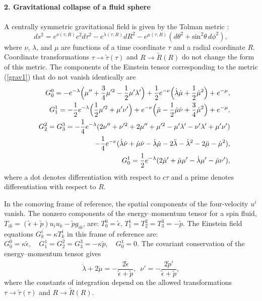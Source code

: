 \documentclass[prd,onecolumn,nofootinbib]{revtex4}
\begin{document}
{\bf 2. Gravitational collapse of a fluid sphere}\\ \\
A centrally symmetric gravitational field is given by the Tolman metric \cite{LL2}:
\begin{equation}
    ds^2=e^{\nu(\tau,R)}c^2 d\tau^2-e^{\lambda(\tau,R)}dR^2-e^{\mu(\tau,R)}(d\theta^2+\mbox{sin}^2\theta\,d\phi^2),
    \label{grav1}
\end{equation}
where $\nu$, $\lambda$, and $\mu$ are functions of a time coordinate $\tau$ and a radial coordinate $R$.
Coordinate transformations $\tau\rightarrow\tilde{\tau}(\tau)$ and $R\rightarrow\tilde{R}(R)$ do not change the form of this metric.
The components of the Einstein tensor corresponding to the metric (\ref{grav1}) that do not vanish identically are \cite{LL2}
\begin{eqnarray}
    & & G_0^0=-e^{-\lambda}\Bigl(\mu''+\frac{3}{4}\mu'^2-\frac{1}{2}\mu'\lambda'\Bigr)+\frac{1}{2}e^{-\nu}\Bigl(\dot{\lambda}\dot{\mu}+\frac{1}{2}\dot{\mu}^2\Bigr)+e^{-\mu}, \nonumber \\
    & & G_1^1=-\frac{1}{2}e^{-\lambda}\Bigl(\frac{1}{2}\mu'^2+\mu'\nu'\Bigr)+e^{-\nu}\Bigl(\ddot{\mu}-\frac{1}{2}\dot{\mu}\dot{\nu}+\frac{3}{4}\dot{\mu}^2\Bigr)+e^{-\mu}, \nonumber \\
    & & G_2^2=G_3^3=-\frac{1}{4}e^{-\lambda}(2\nu''+\nu'^2+2\mu''+\mu'^2-\mu'\lambda'-\nu'\lambda'+\mu'\nu') \nonumber \\
    & & -\frac{1}{4}e^{-\nu}(\dot{\lambda}\dot{\nu}+\dot{\mu}\dot{\nu}-\dot{\lambda}\dot{\mu}-2\ddot{\lambda}-\dot{\lambda}^2-2\ddot{\mu}-\dot{\mu}^2), \nonumber \\
    & & G_0^1=\frac{1}{2}e^{-\lambda}(2\dot{\mu}'+\dot{\mu}\mu'-\dot{\lambda}\mu'-\dot{\mu}\nu'),
    \label{grav2}
\end{eqnarray}
where a dot denotes differentiation with respect to $c\tau$ and a prime denotes differentiation with respect to $R$.

In the comoving frame of reference, the spatial components of the four-velocity $u^i$ vanish.
The nonzero components of the energy--momentum tensor for a spin fluid, $T_{ik}=(\tilde{\epsilon}+\tilde{p})u_i u_k-\tilde{p}g_{ik}$, are: $T^0_0=\tilde{\epsilon}$, $T^1_1=T^2_2=T^3_3=-\tilde{p}$.
The Einstein field equations $G^i_k=\kappa T^i_k$ in this frame of reference are: $G_0^0=\kappa\tilde{\epsilon},\quad G_1^1=G_2^2=G_3^3=-\kappa\tilde{p},\quad G_0^1=0$.
The covariant conservation of the energy--momentum tensor gives \cite{LL2}
\begin{equation}
    \dot{\lambda}+2\dot{\mu}=-\frac{2\dot{\tilde{\epsilon}}}{\tilde{\epsilon}+\tilde{p}},\,\,\,\nu'=-\frac{2\tilde{p}'}{\tilde{\epsilon}+\tilde{p}},
    \label{grav4}
\end{equation}
where the constants of integration depend on the allowed transformations $\tau\rightarrow\tilde{\tau}(\tau)$ and $R\rightarrow\tilde{R}(R)$.
\end{document}
